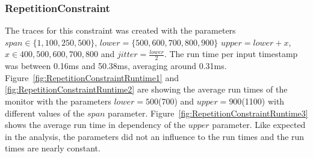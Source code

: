 \subsubsection{RepetitionConstraint}
	The traces for this constraint was created with the parameters $span\in\{1,100,250,500\}$, $lower=\{500,600,700,800,900\}$ $upper=lower+x$, $x\in{400,500,600,700,800}$ and $jitter=\frac{lower}{2}$. The run time per input timestamp was between 0.16ms and 50.38ms, averaging around 0.31ms. Figure~\ref{fig:RepetitionConstraintRuntime1} and \ref{fig:RepetitionConstraintRuntime2} are showing the average run times of the monitor with the parameters $lower=500$(700) and $upper=900$(1100) with different values of the $span$ parameter. Figure~\ref{fig:RepetitionConstraintRuntime3} shows the average run time in dependency of the $upper$ parameter. Like expected in the analysis, the parameters did not an influence to the run times and the run times are nearly constant.
